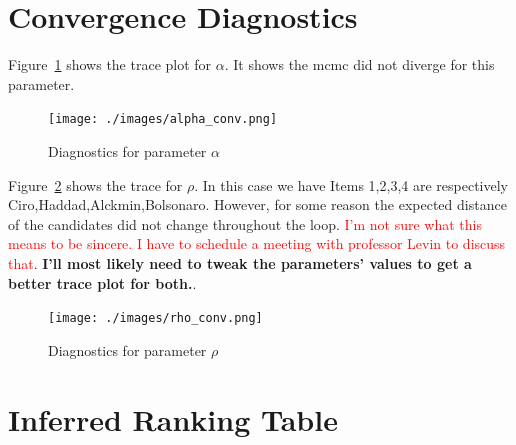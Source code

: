 \documentclass[hidelinks,11pt]{article}
\begin{document}
\section{Convergence Diagnostics}\label{appendix:diagnostics}

Figure~\ref{fig:alphac} shows the trace plot for \(\alpha\). It shows the mcmc did not diverge for this parameter.

\begin{figure}[H]
 \centering
 \texttt{[image: ./images/alpha\_conv.png]}
 \caption{Diagnostics for parameter \(\alpha\)}
 \label{fig:alphac}
\end{figure}

Figure~\ref{fig:rhoc} shows the trace for \(\rho\). In this case we have Items 1,2,3,4 are respectively Ciro,Haddad,Alckmin,Bolsonaro. However, for some reason the expected distance of the candidates did not change throughout the loop. \textcolor{red}{I'm not sure what this means to be sincere. I have to schedule a meeting with professor Levin to discuss that}. \textbf{I'll most likely need to tweak the parameters' values to get a better trace plot for both.}.

\begin{figure}[H]
 \centering
 \texttt{[image: ./images/rho\_conv.png]}
 \caption{Diagnostics for parameter \(\rho\)}
 \label{fig:rhoc}
\end{figure}





\section{Inferred Ranking Table} \label{appendix:inferred1}
\end{document}
